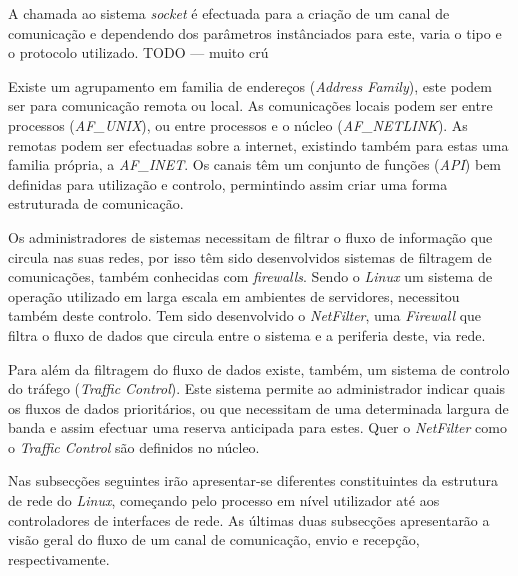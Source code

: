 A chamada ao sistema \textit{socket} é efectuada para a criação de um canal de comunicação e dependendo dos parâmetros instânciados para este, varia o tipo e o protocolo utilizado. TODO --- muito crú

Existe um agrupamento em familia de endereços (\textit{Address Family}), este podem ser para comunicação remota ou local.
As comunicações locais podem ser entre processos (\textit{AF\_UNIX}), ou entre processos e o núcleo (\textit{AF\_NETLINK}).
As remotas podem ser efectuadas sobre a internet, existindo também para estas uma familia própria, a \textit{AF\_INET}.
Os canais têm um conjunto de funções (\textit{API}) bem definidas para utilização e controlo, permintindo assim criar uma forma estruturada de comunicação.

Os administradores de sistemas necessitam de filtrar o fluxo de informação que circula nas suas redes, por isso têm sido desenvolvidos sistemas de filtragem de comunicações, também conhecidas com \textit{firewalls}.
Sendo o \textit{Linux} um sistema de operação utilizado em larga escala em ambientes de servidores, necessitou também deste controlo. Tem sido desenvolvido o \textit{NetFilter}, uma \textit{Firewall} que filtra o fluxo de dados que circula entre o sistema e a periferia deste, via rede.

Para além da filtragem do fluxo de dados existe, também, um sistema de controlo do tráfego (\textit{Traffic Control}).
Este sistema permite ao administrador indicar quais os fluxos de dados prioritários, ou que necessitam de uma determinada largura de banda e assim efectuar uma reserva anticipada para estes.
Quer o \textit{NetFilter} como o \textit{Traffic Control} são definidos no núcleo.
 
Nas subsecções seguintes irão apresentar-se diferentes constituintes da estrutura de rede do \textit{Linux}, começando pelo processo em nível utilizador até aos controladores de interfaces de rede. As últimas duas subsecções apresentarão a visão geral do fluxo de um canal de comunicação, envio e recepção, respectivamente.



